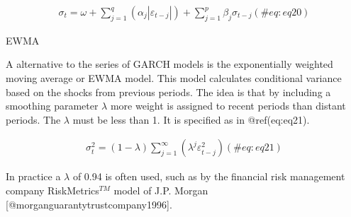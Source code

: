 \documentclass[
]{article}
\begin{document}
\begin{align}
\sigma_t = \omega + \sum\limits_{j=1}^q (\alpha_j \left|\varepsilon_{t-j}\right|) +
\sum\limits_{j = 1}^p \beta_j \sigma_{t-j}
 (\#eq:eq20)
\end{align}

\newpage

EWMA

\noindent A alternative to the series of GARCH models is the
exponentially weighted moving average or EWMA model. This model
calculates conditional variance based on the shocks from previous
periods. The idea is that by including a smoothing parameter \(\lambda\)
more weight is assigned to recent periods than distant periods. The
\(\lambda\) must be less than 1. It is specified as in @ref(eq:eq21).

\begin{align}
\sigma_t^2 = (1-\lambda) \sum\limits_{j=1}^\infty (\lambda^j \varepsilon_{t-j}^2)
 (\#eq:eq21)
\end{align}

In practice a \(\lambda\) of 0.94 is often used, such as by the
financial risk management company RiskMetrics\(^{TM}\) model of J.P.
Morgan {[}@morganguarantytrustcompany1996{]}.
\end{document}
